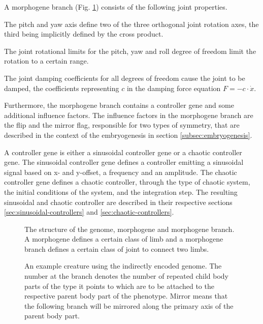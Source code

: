 \documentclass[main]{subfiles}
\begin{document}
A morphogene branch (Fig. \ref{figure:genome-structure}) consists of the following joint properties. %

The pitch and yaw axis define two of the three orthogonal joint rotation axes, the third being implicitly defined by the cross product. %

The joint rotational limits for the pitch, yaw and roll degree of freedom limit the rotation to a certain range. %

The joint damping coefficients for all degrees of freedom cause the joint to be damped, the coefficients representing \(c\) in the damping force equation \(F = -c \cdot \dot x\). %

Furthermore, the morphogene branch contains a controller gene and some additional influence factors. %
%
The influence factors in the morphogene branch are the flip and the mirror flag, responsible for two types of symmetry, that are described in the context of the embryogenesis in section \ref{subsec:embryogenesis}.

A controller gene is either a sinusoidal controller gene or a chaotic controller gene. %
%
The sinusoidal controller gene defines a controller emitting a sinusoidal signal based on x- and y-offset, a frequency and an amplitude. %
%
The chaotic controller gene defines a chaotic controller, through the type of chaotic system, the initial conditions of the system, and the integration step. %
%
The resulting sinusoidal and chaotic controller are described in their respective sections \ref{sec:sinusoidal-controllers} and \ref{sec:chaotic-controllers}.

\begin{figure}[H]
\hspace*{-0.2in}


\caption[Indirectly encoded genome structure]{The structure of the genome, morphogene and morphogene branch. A morphogene defines a certain class of limb and a morphogene branch defines a certain class of joint to connect two limbs.}
\label{figure:genome-structure}
\end{figure}

\begin{figure}[H]
\center


\caption[Example creature using an indirectly encoded genome]{An example creature using the indirectly encoded genome. The number at the branch denotes the number of repeated child body parts of the type it points to which are to be attached to the respective parent body part of the phenotype. Mirror means that the following branch will be mirrored along the primary axis of the parent body part.}
\label{figure:indirect-genotype}
\end{figure}
\end{document}
